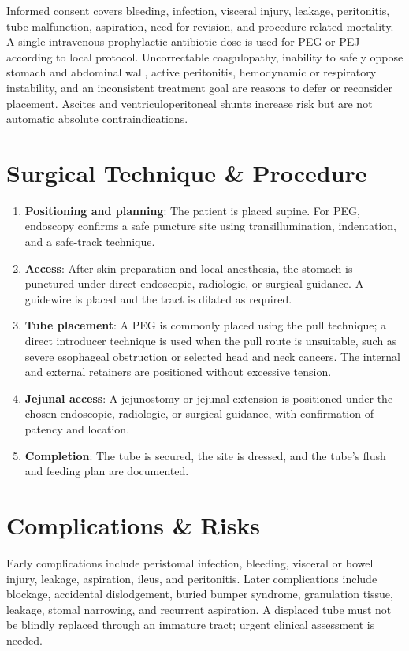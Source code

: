 Informed consent covers bleeding, infection, visceral injury, leakage, peritonitis, tube malfunction, aspiration, need for revision, and procedure-related mortality. A single intravenous prophylactic antibiotic dose is used for PEG or PEJ according to local protocol. Uncorrectable coagulopathy, inability to safely oppose stomach and abdominal wall, active peritonitis, hemodynamic or respiratory instability, and an inconsistent treatment goal are reasons to defer or reconsider placement. Ascites and ventriculoperitoneal shunts increase risk but are not automatic absolute contraindications.

\section*{Surgical Technique \& Procedure}
\begin{enumerate}
  \item \textbf{Positioning and planning}: The patient is placed supine. For PEG, endoscopy confirms a safe puncture site using transillumination, indentation, and a safe-track technique.
  \item \textbf{Access}: After skin preparation and local anesthesia, the stomach is punctured under direct endoscopic, radiologic, or surgical guidance. A guidewire is placed and the tract is dilated as required.
  \item \textbf{Tube placement}: A PEG is commonly placed using the pull technique; a direct introducer technique is used when the pull route is unsuitable, such as severe esophageal obstruction or selected head and neck cancers. The internal and external retainers are positioned without excessive tension.
  \item \textbf{Jejunal access}: A jejunostomy or jejunal extension is positioned under the chosen endoscopic, radiologic, or surgical guidance, with confirmation of patency and location.
  \item \textbf{Completion}: The tube is secured, the site is dressed, and the tube's flush and feeding plan are documented.
\end{enumerate}

\section*{Complications \& Risks}
Early complications include peristomal infection, bleeding, visceral or bowel injury, leakage, aspiration, ileus, and peritonitis. Later complications include blockage, accidental dislodgement, buried bumper syndrome, granulation tissue, leakage, stomal narrowing, and recurrent aspiration. A displaced tube must not be blindly replaced through an immature tract; urgent clinical assessment is needed.

